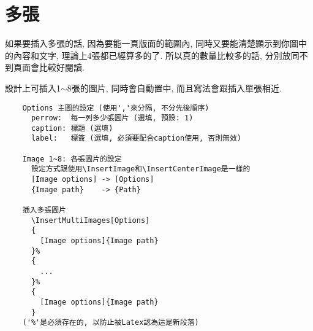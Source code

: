 
\newpage
\section{多張}

  如果要插入多張的話, 因為要能一頁版面的範圍內, 同時又要能清楚顯示到你圖中的內容和文字, 理論上4張都已經算多的了. 所以真的數量比較多的話, 分別放同不到頁面會比較好閱讀.

  設計上可插入1$\sim$8張的圖片, 同時會自動置中, 而且寫法會跟插入單張相近.

  \begin{framed}
  \begin{verbatim}
    Options 主圖的設定 (使用','來分隔, 不分先後順序)
      perrow:  每一列多少張圖片 (選填, 預設: 1)
      caption: 標題 (選填)
      label:   標簽 (選填, 必須要配合caption使用, 否則無效)

    Image 1~8: 各張圖片的設定
      設定方式跟使用\InsertImage和\InsertCenterImage是一樣的
      [Image options] -> [Options]
      {Image path}    -> {Path}

    插入多張圖片
      \InsertMultiImages[Options]
      {
        [Image options]{Image path}
      }%
      {
        ...
      }%
      {
        [Image options]{Image path}
      }
    ('%'是必須存在的, 以防止被Latex認為這是新段落)
  \end{verbatim}
  \end{framed}

